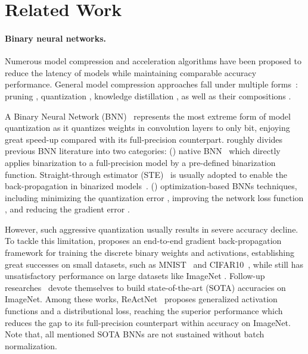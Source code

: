 \documentclass[final]{cvpr}
\begin{document}
\section{Related Work}
\paragraph{Binary neural networks.} Numerous model compression and acceleration algorithms have been proposed to reduce the latency of models while maintaining comparable accuracy performance. General model compression approaches fall under multiple forms~\cite{cheng2017survey}: pruning \cite{han2015learning,wen2016learning}, quantization \cite{wu2016quantized,shen2020fractional,fu2020fractrain}, knowledge distillation \cite{hinton2015distilling,mishra2017apprentice}, as well as their compositions \cite{wang2019e2,you2020shiftaddnet,zhao2020smartexchange}.


A Binary Neural Network (BNN)~\cite{courbariaux2015binaryconnect,courbariaux2016binarized,kim2016bitwise,zhou2016dorefa,rastegari2016xnor,courbariaux2016binarized,li2017performance,polino2018model,mishra2017apprentice,hou2016loss,zhou2017incremental,liu2018bi,helwegen2019latent,liu2019circulant,cai2017deep,shen2019searching,han2020training,xu2021learning} represents the most extreme form of model quantization as it quantizes weights in convolution layers to only  bit, enjoying great speed-up compared with its full-precision counterpart. \cite{qin2020binary} roughly divides previous BNN literature into two categories: () native BNN~\cite{courbariaux2015binaryconnect,courbariaux2016binarized,kim2016bitwise} which directly applies binarization to a full-precision model by a pre-defined binarization function. Straight-through estimator (STE)~\cite{hinton2012,bengio2013estimating} is usually adopted to enable the back-propagation in binarized models~\cite{courbariaux2015binaryconnect}. () optimization-based BNNs techniques, including minimizing the quantization error \cite{zhou2016dorefa,rastegari2016xnor,courbariaux2016binarized,li2017performance}, improving the network loss function \cite{polino2018model,mishra2017apprentice,hou2016loss,zhou2017incremental}, and reducing the gradient error \cite{liu2018bi,helwegen2019latent,liu2019circulant,cai2017deep}.

However, such aggressive quantization usually results in severe accuracy decline. To tackle this limitation, \cite{courbariaux2016binarized} proposes an end-to-end gradient back-propagation framework for training the discrete binary weights and activations, establishing great successes on small datasets, such as MNIST~\cite{umuroglu2017finn} and CIFAR10~\cite{wang2019learning}, while still has unsatisfactory performance on large datasets like ImageNet \cite{liu2020reactnet}. Follow-up researches~\cite{bulat2019xnor,gu2019projection,Martinez2020Training,liu2018bi,liu2020reactnet} devote themselves to build state-of-the-art (SOTA) accuracies on ImageNet. Among these works, ReActNet~\cite{liu2020reactnet} proposes generalized activation functions and a distributional loss, reaching the superior performance which reduces the gap to its full-precision counterpart within  accuracy on ImageNet. Note that, all mentioned SOTA BNNs are not sustained without batch normalization.
\end{document}
